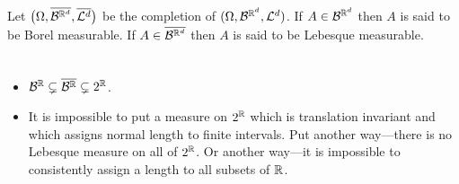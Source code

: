 \begin{definition}
Let $\bigl(\Omega,\overline{\mathcal B^{\Bbb R^d}},\overline{\mathcal L^d}\bigr)$ be the completion of $(\Omega, \mathcal B^{\Bbb R^d},\mathcal L^d)$. If $A\in \mathcal B^{\Bbb R^d}$ then $A$ is said to be {Borel measurable}. If $A\in \overline{\mathcal B^{\Bbb R^d}}$ then $A$ is said to be {Lebesque measurable}.
\end{definition}

\begin{theorem}
$\phantom{asdf}$
\begin{itemize}
\item $\mathcal B^{\Bbb R}\subsetneq \overline{\mathcal B^{\Bbb R}} \subsetneq 2^\Bbb R$.
\item It is impossible to put a measure on $2^\Bbb R$ which is translation invariant and which assigns normal length to finite intervals. Put another way---there is no Lebesque measure on all of $2^\Bbb R$. Or another way---it is impossible to consistently assign a length to all subsets of $\Bbb R$.
\end{itemize}
\end{theorem}
